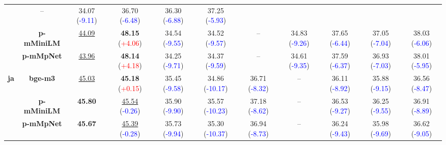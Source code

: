 \begin{table*}[!ht]
{\begin{tabular}{cc|>{\columncolor{gray!15}}c|cccccccc}
  & -- 
  & 34.07 {\scriptsize(\textcolor{blue}{-9.11})}
  & 36.70 {\scriptsize(\textcolor{blue}{-6.48})}
  & 36.30 {\scriptsize(\textcolor{blue}{-6.88})}
  & 37.25 {\scriptsize(\textcolor{blue}{-5.93})} \\
& \textbf{p-mMiniLM}
  & \underline{44.09}
  & \textbf{48.15} {\scriptsize(\textcolor{red}{+4.06})}
  & 34.54 {\scriptsize(\textcolor{blue}{-9.55})}
  & 34.52 {\scriptsize(\textcolor{blue}{-9.57})}
  & -- 
  & 34.83 {\scriptsize(\textcolor{blue}{-9.26})}
  & 37.65 {\scriptsize(\textcolor{blue}{-6.44})}
  & 37.05 {\scriptsize(\textcolor{blue}{-7.04})}
  & 38.03 {\scriptsize(\textcolor{blue}{-6.06})} \\
& \textbf{p-mMpNet}
  & \underline{43.96}
  & \textbf{48.14} {\scriptsize(\textcolor{red}{+4.18})}
  & 34.25 {\scriptsize(\textcolor{blue}{-9.71})}
  & 34.37 {\scriptsize(\textcolor{blue}{-9.59})}
  & -- 
  & 34.61 {\scriptsize(\textcolor{blue}{-9.35})}
  & 37.59 {\scriptsize(\textcolor{blue}{-6.37})}
  & 36.93 {\scriptsize(\textcolor{blue}{-7.03})}
  & 38.01 {\scriptsize(\textcolor{blue}{-5.95})} \\
\midrule
\multirow{3}{*}{\textbf{ja}}
& \textbf{bge-m3}
  & \underline{45.03}
  & \textbf{45.18} {\scriptsize(\textcolor{red}{+0.15})}
  & 35.45 {\scriptsize(\textcolor{blue}{-9.58})}
  & 34.86 {\scriptsize(\textcolor{blue}{-10.17})}
  & 36.71 {\scriptsize(\textcolor{blue}{-8.32})}
  & -- 
  & 36.11 {\scriptsize(\textcolor{blue}{-8.92})}
  & 35.88 {\scriptsize(\textcolor{blue}{-9.15})}
  & 36.56 {\scriptsize(\textcolor{blue}{-8.47})} \\
& \textbf{p-mMiniLM}
  & \textbf{45.80}
  & \underline{45.54} {\scriptsize(\textcolor{blue}{-0.26})}
  & 35.90 {\scriptsize(\textcolor{blue}{-9.90})}
  & 35.57 {\scriptsize(\textcolor{blue}{-10.23})}
  & 37.18 {\scriptsize(\textcolor{blue}{-8.62})}
  & -- 
  & 36.53 {\scriptsize(\textcolor{blue}{-9.27})}
  & 36.25 {\scriptsize(\textcolor{blue}{-9.55})}
  & 36.91 {\scriptsize(\textcolor{blue}{-8.89})} \\
& \textbf{p-mMpNet}
  & \textbf{45.67}
  & \underline{45.39} {\scriptsize(\textcolor{blue}{-0.28})}
  & 35.73 {\scriptsize(\textcolor{blue}{-9.94})}
  & 35.30 {\scriptsize(\textcolor{blue}{-10.37})}
  & 36.94 {\scriptsize(\textcolor{blue}{-8.73})}
  & -- 
  & 36.24 {\scriptsize(\textcolor{blue}{-9.43})}
  & 35.98 {\scriptsize(\textcolor{blue}{-9.69})}
  & 36.62 {\scriptsize(\textcolor{blue}{-9.05})} \\
\midrule

\end{tabular}}
\end{table*}

